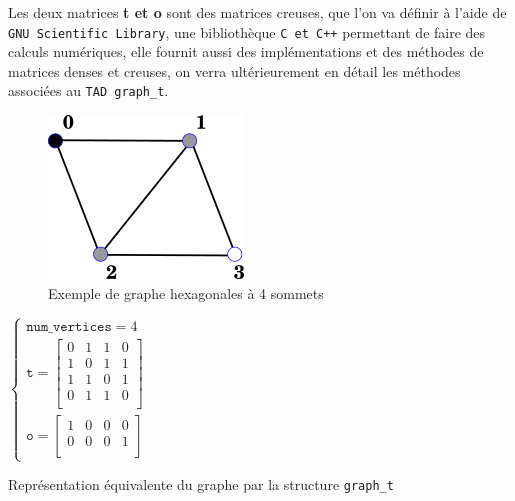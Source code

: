 \documentclass[a4paper,10pt]{article}
\begin{document}
Les deux matrices \textbf{ t et o} sont des matrices creuses, que l'on va définir à l'aide de \texttt{GNU Scientific Library}, une bibliothèque \texttt{C et C++} permettant de faire des calculs numériques, elle fournit aussi des implémentations et des méthodes de matrices denses et creuses, on verra ultérieurement en détail les méthodes associées au \texttt{TAD graph\_t}.
\newpage
\begin{multicols}{2}
\begin{figure}[H]
  \begin{center}
  \includegraphics[scale=1.5]{hex4.png}
  \caption{Exemple de graphe hexagonales à 4 sommets}
  \label{fig1}
  \end{center}
\end{figure}
\columnbreak

\begin{center}
$\begin{cases}
    \texttt{num\_vertices}=4 \\
    \texttt{t}=\begin{bmatrix}
        0 & 1 & 1 & 0\\
        1 & 0 & 1 & 1\\
        1 & 1 & 0 & 1\\
        0 & 1 & 1 & 0\\
    \end{bmatrix}\\
    \texttt{o}=\begin{bmatrix}
        1 & 0 & 0 & 0\\
        0 & 0 & 0 & 1\\
    \end{bmatrix}
\end{cases}$
\end{center}
Représentation équivalente du graphe par la structure \texttt{graph\_t}
\end{multicols}
\end{document}
